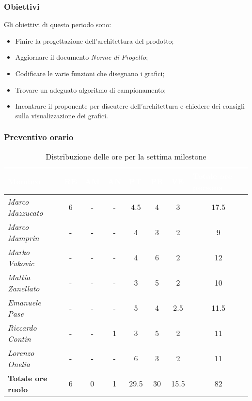 \subsubsection{Obiettivi}
Gli obiettivi di questo periodo sono:
\begin{itemize}
    \item Finire la progettazione dell'architettura del prodotto;
    \item Aggiornare il documento \textit{Norme di Progetto};
    \item Codificare le varie funzioni che disegnano i grafici;
    \item Trovare un adeguato algoritmo di campionamento;
    \item Incontrare il proponente per discutere dell'architettura e chiedere dei consigli sulla visualizzazione dei grafici.
\end{itemize}

\subsubsection{Preventivo orario}

\begin{table}[H]
    \renewcommand\arraystretch{1.5}
    \centering
    \begin{tabular}{|l|c|c|c|c|c|c|c|}
    \hline
    \rowcolor[HTML]{036400}
    \textcolor{white}{\textbf{Membro}} & \multicolumn{1}{l|}{\textcolor{white}{\textbf{RE}}} & \multicolumn{1}{l|}{\textcolor{white}{\textbf{AM}}} & \multicolumn{1}{l|}{\textcolor{white}{\textbf{AN}}} & \multicolumn{1}{l|}{\textcolor{white}{\textbf{PT}}} & \multicolumn{1}{l|}{\textcolor{white}{\textbf{PR}}} & \multicolumn{1}{l|}{\textcolor{white}{\textbf{VE}}} & \multicolumn{1}{l|}{\textcolor{white}{\textbf{Totale ore persona}}} \\ \hline
    \rowcolor[HTML]{EFEFEF}\textit{Marco Mazzucato}  & 6 & -   & -  & 4.5  & 4   & 3    & 17.5     \\ \hline
    \rowcolor[HTML]{C0C0C0}\textit{Marco Mamprin}    & - & -   & -  & 4    & 3   & 2    & 9     \\ \hline
    \rowcolor[HTML]{EFEFEF}\textit{Marko Vukovic}    & - & -   & -  & 4    & 6   & 2    & 12     \\ \hline
    \rowcolor[HTML]{C0C0C0}\textit{Mattia Zanellato} & - & -   & -  & 3    & 5   & 2    & 10     \\ \hline
    \rowcolor[HTML]{EFEFEF}\textit{Emanuele Pase}    & - & -   & -  & 5    & 4   & 2.5  & 11.5     \\ \hline
    \rowcolor[HTML]{C0C0C0}\textit{Riccardo Contin}  & - & -   & 1  & 3    & 5   & 2    & 11     \\ \hline
    \rowcolor[HTML]{EFEFEF}\textit{Lorenzo Onelia}   & - & -   & -  & 6    & 3   & 2    & 11    \\ \hline
    \rowcolor[HTML]{C0C0C0}\textbf{Totale ore ruolo} & 6 & 0   & 1  & 29.5 & 30  & 15.5 & 82    \\ \hline
    \end{tabular}
    \caption{Distribuzione delle ore per la settima milestone}
\end{table}

